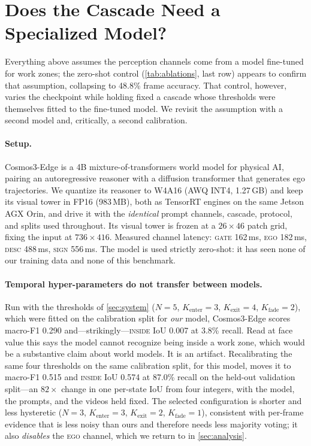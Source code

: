 \section{Does the Cascade Need a Specialized Model?}
\label{sec:worldmodel}

Everything above assumes the perception channels come from a model fine-tuned for work zones; the zero-shot control (\cref{tab:ablations}, last row) appears to confirm that assumption, collapsing to 48.8\% frame accuracy.  That control, however, varies the checkpoint while holding fixed a cascade whose thresholds were themselves fitted to the fine-tuned model.  We revisit the assumption with a second model and, critically, a second calibration.

\paragraph{Setup.}  Cosmos3-Edge is a 4B mixture-of-transformers world model for physical AI, pairing an autoregressive reasoner with a diffusion transformer that generates ego trajectories.  We quantize its reasoner to W4A16 (AWQ INT4, 1.27\,GB) and keep its visual tower in FP16 (983\,MB), both as TensorRT engines on the same Jetson AGX Orin, and drive it with the \emph{identical} prompt channels, cascade, protocol, and splits used throughout.  Its visual tower is frozen at a $26{\times}46$ patch grid, fixing the input at $736{\times}416$.  Measured channel latency: \textsc{gate} 162\,ms, \textsc{ego} 182\,ms, \textsc{desc} 488\,ms, \textsc{sign} 556\,ms.  The model is used strictly zero-shot: it has seen none of our training data and none of this benchmark.

\paragraph{Temporal hyper-parameters do not transfer between models.}  Run with the thresholds of \cref{sec:system} ($N{=}5$, $K_{\text{enter}}{=}3$, $K_{\text{exit}}{=}4$, $K_{\text{fade}}{=}2$), which were fitted on the calibration split for \emph{our} model, Cosmos3-Edge scores macro-F1 0.290 and---strikingly---\textsc{inside} IoU 0.007 at 3.8\% recall.  Read at face value this says the model cannot recognize being inside a work zone, which would be a substantive claim about world models.  It is an artifact.  Recalibrating the same four thresholds on the same calibration split, for this model, moves it to macro-F1 0.515 and \textsc{inside} IoU 0.574 at 87.0\% recall on the held-out validation split---an $82{\times}$ change in one per-state IoU from four integers, with the model, the prompts, and the videos held fixed.  The selected configuration is shorter and less hysteretic ($N{=}3$, $K_{\text{enter}}{=}3$, $K_{\text{exit}}{=}2$, $K_{\text{fade}}{=}1$), consistent with per-frame evidence that is less noisy than ours and therefore needs less majority voting; it also \emph{disables} the \textsc{ego} channel, which we return to in \cref{sec:analysis}.

